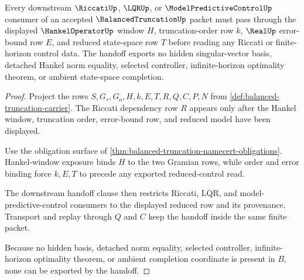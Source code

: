 \begin{theorem}
\label{thm:balanced-truncation-hankel-riccati-handoff}
Every downstream $\RiccatiUp$, $\LQRUp$, or $\ModelPredictiveControlUp$ consumer of an accepted $\BalancedTruncationUp$ packet must pass through the displayed $\HankelOperatorUp$ window $H$, truncation-order row $k$, $\RealUp$ error-bound row $E$, and reduced state-space row $T$ before reading any Riccati or finite-horizon control data. The handoff exports no hidden singular-vector basis, detached Hankel norm equality, selected controller, infinite-horizon optimality theorem, or ambient state-space completion.
\end{theorem}
\begin{proof}
Project the rows $S,G_r,G_o,H,k,E,T,R,Q,C,P,N$ from \autoref{def:balanced-truncation-carrier}. The Riccati dependency row $R$ appears only after the Hankel window, truncation order, error-bound row, and reduced model have been displayed.

Use the obligation surface of \autoref{thm:balanced-truncation-namecert-obligations}. Hankel-window exposure binds $H$ to the two Gramian rows, while order and error binding force $k,E,T$ to precede any exported reduced-control read.

The downstream handoff clause then restricts Riccati, LQR, and model-predictive-control consumers to the displayed reduced row and its provenance. Transport and replay through $Q$ and $C$ keep the handoff inside the same finite packet.

Because no hidden basis, detached norm equality, selected controller, infinite-horizon optimality theorem, or ambient completion coordinate is present in $B$, none can be exported by the handoff.
\end{proof}


